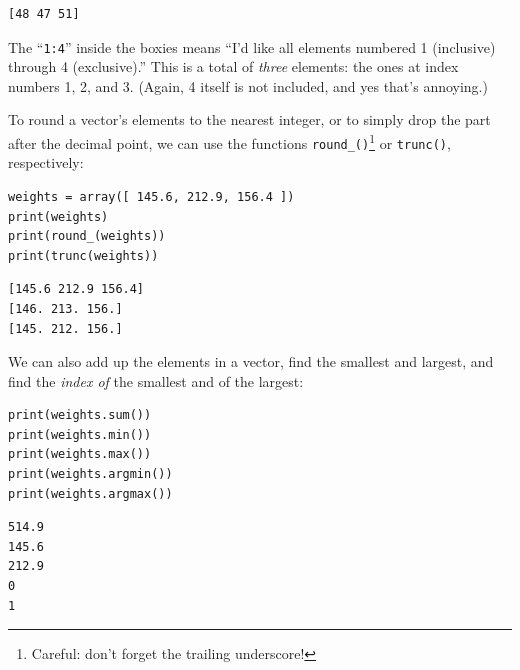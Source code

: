 \begin{Verbatim}[fontsize=\small,samepage=true,frame=leftline,framesep=5mm,framerule=1mm]
[48 47 51]
\end{Verbatim}

The ``\texttt{1:4}'' inside the boxies means ``I'd like all elements numbered 1
(inclusive) through 4 (exclusive).'' This is a total of \textit{three}
elements: the ones at index numbers 1, 2, and 3. (Again, 4 itself is not
included, and yes that's annoying.)

\medskip
{}

To round a vector's elements to the nearest integer, or to simply drop the part
after the decimal point, we can use the functions
\texttt{round\_()}\footnote{Careful: don't forget the trailing underscore!} or
\texttt{trunc()}, respectively:

\begin{Verbatim}[fontsize=\small,samepage=true,frame=single,framesep=3mm]
weights = array([ 145.6, 212.9, 156.4 ])
print(weights)
print(round_(weights))
print(trunc(weights))
\end{Verbatim}
\vspace{-.2in}

\begin{Verbatim}[fontsize=\small,samepage=true,frame=leftline,framesep=5mm,framerule=1mm]
[145.6 212.9 156.4]
[146. 213. 156.]
[145. 212. 156.]
\end{Verbatim}

\medskip
We can also add up the elements in a vector, find the smallest and largest, and
find the \textit{index of} the smallest and of the largest:


\begin{Verbatim}[fontsize=\small,samepage=true,frame=single,framesep=3mm]
print(weights.sum())
print(weights.min())
print(weights.max())
print(weights.argmin())
print(weights.argmax())
\end{Verbatim}
\vspace{-.2in}

\begin{Verbatim}[fontsize=\small,samepage=true,frame=leftline,framesep=5mm,framerule=1mm]
514.9
145.6
212.9
0
1
\end{Verbatim}

